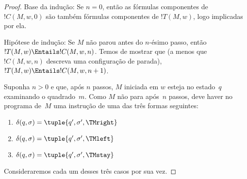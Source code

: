 \documentclass[../../../include/open-logic-section]{subfiles}
\begin{document}
\begin{proof}
Base da indução: Se $n = 0$, então as fórmulas componentes de $!C(M,
w, 0)$ são também fórmulas componentes de $!T(M, w)$, logo implicadas
por ela.

Hipótese de indução: Se $M$ não parou antes do $n$-ésimo passo,
então $!T(M,w) \Entails !C(M, w, n)$. Temos de mostrar que (a menos
que $!C(M, w, n)$ descreva uma configuração de parada), $!T(M, w)
\Entails !C(M, w, n+1)$.

Suponha $n > 0$ e que, após $n$ passos, $M$ iniciada em $w$ esteja no
estado~$q$ examinando o quadrado~$m$. Como $M$ não para após~$n$
passos, deve haver no programa de~$M$ uma instrução de uma das três
formas seguintes:

\begin{enumerate} 
\item {} $\delta(q, \sigma) = \tuple{q', \sigma', \TMright}$

\item {} $\delta(q, \sigma) = \tuple{q', \sigma', \TMleft}$

\item {} $\delta(q, \sigma) = \tuple{q', \sigma', \TMstay}$
\end{enumerate}

Consideraremos cada um desses três casos por sua vez. 


\end{proof}
\end{document}
